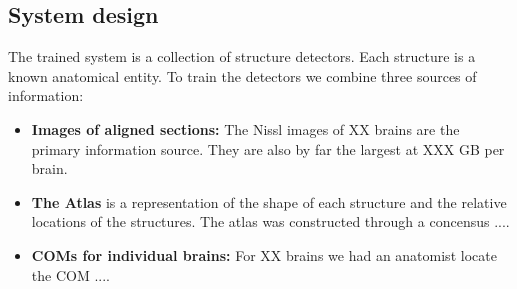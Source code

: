 \documentclass[runningheads]{llncs}
\begin{document}
\subsection{System design}

The trained system is a collection of structure detectors. Each structure is a known anatomical entity. To train the detectors we combine three sources of information:
\begin{itemize}
    \item {\bf Images of aligned sections:} The Nissl images of XX brains are the primary information source. They are also by far the largest at XXX GB per brain.
    \item {\bf The Atlas} is a representation of the shape of each structure and the relative locations of the structures. The atlas was constructed through a concensus ....
    \item {\bf COMs for individual brains:} For XX brains we had an anatomist locate the COM ....
\end{itemize}
\end{document}

